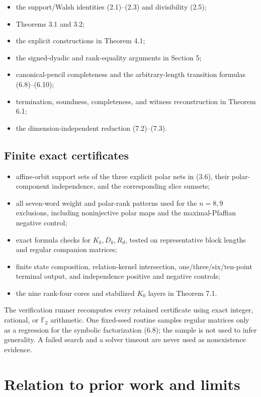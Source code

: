 \documentclass[11pt]{article}
\theoremstyle{remark}
\numberwithin{equation}{section}
\begin{document}
\begin{itemize}
\item the support/Walsh identities (2.1)--(2.3) and divisibility (2.5);
\item Theorems 3.1 and 3.2;
\item the explicit constructions in Theorem 4.1;
\item the signed-dyadic and rank-equality arguments in Section 5;
\item canonical-pencil completeness and the arbitrary-length transition formulas
(6.8)--(6.10);
\item termination, soundness, completeness, and witness reconstruction in
Theorem 6.1;
\item the dimension-independent reduction (7.2)--(7.3).
\end{itemize}


\subsection{Finite exact certificates}


\begin{itemize}
\item affine-orbit support sets of the three explicit polar nets in (3.6), their
polar-component independence, and the corresponding slice sumsets;
\item all seven-word weight and polar-rank patterns used for the \(n=8,9\)
exclusions, including noninjective polar maps and the maximal-Pfaffian
negative control;
\item exact formula checks for \(K_k,D_k,R_d\), tested on representative block
lengths and regular companion matrices;
\item finite state composition, relation-kernel intersection, one/three/six/ten-point
terminal output, and independence positive and negative controls;
\item the nine rank-four cores and stabilized \(K_0\) layers in Theorem 7.1.
\end{itemize}


The verification runner recomputes every retained certificate using exact
integer, rational, or \(\mathbb F_2\) arithmetic. One fixed-seed routine samples
regular matrices only as a regression for the symbolic factorization (6.8);
the sample is not used to infer generality. A failed search and a solver timeout
are never used as nonexistence evidence.

\section{Relation to prior work and limits}
\end{document}
